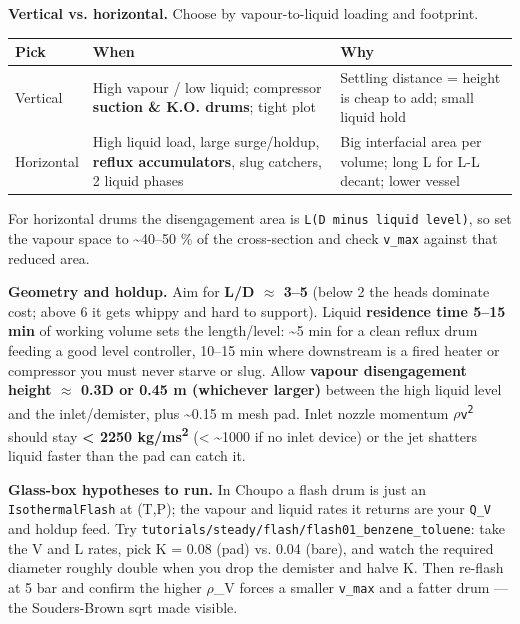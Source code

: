 \documentclass[11pt,a4paper]{article}
\begin{document}
\textbf{Vertical vs. horizontal.} Choose by vapour-to-liquid loading and
footprint.

\begin{longtable}[]{@{}>{\raggedright\arraybackslash}p{\dimexpr(\linewidth-6\tabcolsep)/3\relax}>{\raggedright\arraybackslash}p{\dimexpr(\linewidth-6\tabcolsep)/3\relax}>{\raggedright\arraybackslash}p{\dimexpr(\linewidth-6\tabcolsep)/3\relax}@{}}
\toprule\noalign{}
Pick & When & Why \\
\midrule\noalign{}
\endhead
\bottomrule\noalign{}
\endlastfoot
Vertical & High vapour / low liquid; compressor \textbf{suction \& K.O.
drums}; tight plot & Settling distance = height is cheap to add; small
liquid hold \\
Horizontal & High liquid load, large surge/holdup, \textbf{reflux
accumulators}, slug catchers, 2 liquid phases & Big interfacial area per
volume; long L for L-L decant; lower vessel \\
\end{longtable}

For horizontal drums the disengagement area is
\texttt{L\textperiodcentered{}(D\ minus\ liquid\ level)}, so set the vapour space to
\textasciitilde40--50 \% of the cross-section and check \texttt{v\_max}
against that reduced area.

\textbf{Geometry and holdup.} Aim for \textbf{L/D \(\approx\) 3--5} (below 2 the
heads dominate cost; above 6 it gets whippy and hard to support). Liquid
\textbf{residence time 5--15 min} of working volume sets the
length/level: \textasciitilde5 min for a clean reflux drum feeding a
good level controller, 10--15 min where downstream is a fired heater or
compressor you must never starve or slug. Allow \textbf{vapour
disengagement height \(\approx\) 0.3\textperiodcentered{}D or 0.45 m (whichever larger)} between the
high liquid level and the inlet/demister, plus \textasciitilde0.15 m
mesh pad. Inlet nozzle momentum \texttt{\(\rho\)\textperiodcentered{}v\textsuperscript{2}} should stay
\textbf{\textless{} 2250 kg/m\textperiodcentered{}s\textsuperscript{2}} (\textless{} \textasciitilde1000 if no
inlet device) or the jet shatters liquid faster than the pad can catch
it.

\textbf{Glass-box hypotheses to run.} In Choupo a flash drum is just an
\texttt{IsothermalFlash} at (T,P); the vapour and liquid rates it
returns are your \texttt{Q\_V} and holdup feed. Try
\texttt{tutorials/steady/flash/flash01\_benzene\_toluene}: take the V
and L rates, pick K = 0.08 (pad) vs. 0.04 (bare), and watch the required
diameter roughly double when you drop the demister and halve K. Then
re-flash at 5 bar and confirm the higher \(\rho\)\_V forces a smaller
\texttt{v\_max} and a fatter drum --- the Souders-Brown sqrt made
visible.
\end{document}
